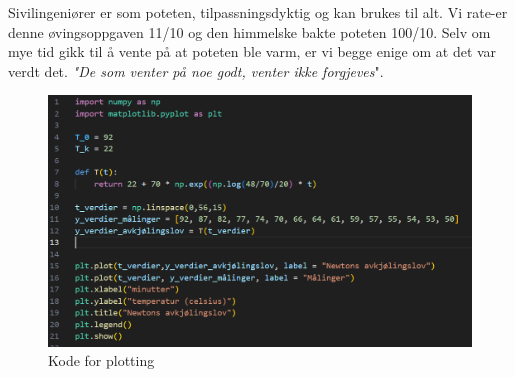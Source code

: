 \documentclass[12pt]{article}
\begin{document}
\FloatBarrier

Sivilingeniører er som poteten, tilpassningsdyktig og kan brukes til alt. Vi rate-er denne øvingsoppgaven 11/10 og den himmelske bakte poteten 100/10. Selv om mye tid gikk til å vente på at poteten ble varm, er vi begge enige om at det var verdt det. \textit{"De som venter på noe godt, venter ikke forgjeves}". 


 \begin{figure}[h]
     \centering
     \includegraphics[width=0.5\linewidth ]{oblig kode.PNG}
     \caption{Kode for plotting}
     \label{fig:enter-label}
 \end{figure}
 
\end{document}
